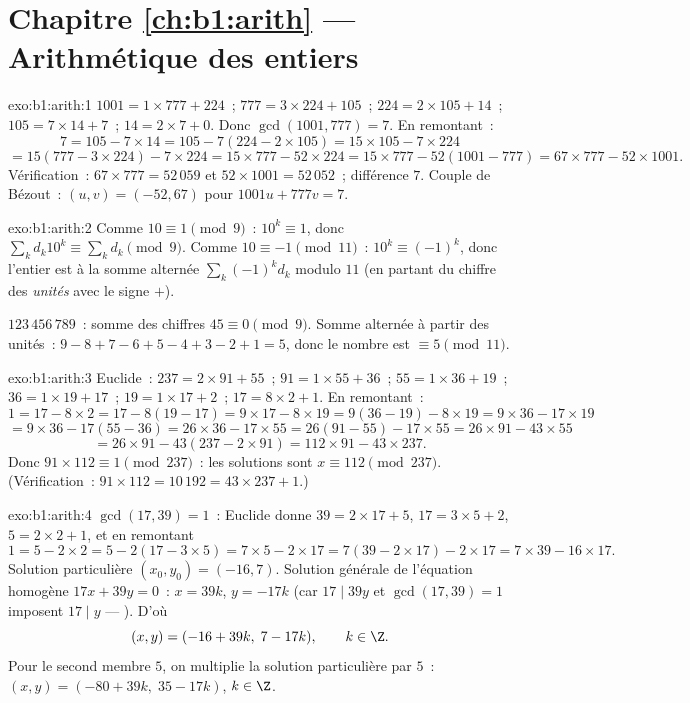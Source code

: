 \section*{Chapitre \ref{ch:b1:arith} --- Arithmétique des entiers}

\begin{solution}{exo:b1:arith:1}
$1001 = 1 \times 777 + 224$~; $777 = 3 \times 224 + 105$~; $224 = 2
\times 105 + 14$~; $105 = 7 \times 14 + 7$~; $14 = 2 \times 7 + 0$. Donc
$\gcd(1001, 777) = 7$. En remontant~:
\[
7 = 105 - 7 \times 14
= 105 - 7(224 - 2\times 105) = 15 \times 105 - 7 \times 224
\]
\[
= 15(777 - 3\times 224) - 7\times 224 = 15 \times 777 - 52 \times 224
= 15 \times 777 - 52(1001 - 777) = 67 \times 777 - 52 \times 1001 .
\]
Vérification~: $67 \times 777 = 52\,059$ et $52 \times 1001 = 52\,052$~;
différence $7$. Couple de Bézout~: $(u, v) = (-52, 67)$ pour $1001u + 777v =
7$.
\end{solution}

\begin{solution}{exo:b1:arith:2}
Comme $10 \equiv 1 \pmod 9$~: $10^k \equiv 1$, donc $\sum_k d_k 10^k
\equiv \sum_k d_k \pmod 9$. Comme $10 \equiv -1 \pmod{11}$~: $10^k
\equiv (-1)^k$, donc l'entier est  à la somme alternée
$\sum_k (-1)^k d_k$ modulo $11$ (en partant du chiffre des \emph{unités}
avec le signe $+$).

$123\,456\,789$~: somme des chiffres $45 \equiv 0 \pmod 9$. Somme alternée à partir
des unités~: $9 - 8 + 7 - 6 + 5 - 4 + 3 - 2 + 1 = 5$, donc le nombre est
$\equiv 5 \pmod{11}$.
\end{solution}

\begin{solution}{exo:b1:arith:3}
Euclide~: $237 = 2 \times 91 + 55$~; $91 = 1 \times 55 + 36$~; $55 = 1
\times 36 + 19$~; $36 = 1 \times 19 + 17$~; $19 = 1 \times 17 + 2$~; $17
= 8 \times 2 + 1$. En remontant~:
\[
1 = 17 - 8\times 2 = 17 - 8(19 - 17) = 9\times 17 - 8\times 19
= 9(36 - 19) - 8\times 19 = 9\times 36 - 17\times 19
\]
\[
= 9\times 36 - 17(55 - 36) = 26\times 36 - 17\times 55
= 26(91 - 55) - 17\times 55 = 26\times 91 - 43\times 55
\]
\[
= 26\times 91 - 43(237 - 2\times 91) = 112 \times 91 - 43 \times 237.
\]
Donc $91 \times 112 \equiv 1 \pmod{237}$~: les solutions sont $x \equiv
112 \pmod{237}$. (Vérification~: $91 \times 112 = 10\,192 = 43 \times 237 +
1$.)
\end{solution}

\begin{solution}{exo:b1:arith:4}
$\gcd(17, 39) = 1$~: Euclide donne $39 = 2\times 17 + 5$, $17 = 3\times
5 + 2$, $5 = 2\times 2 + 1$, et en remontant
\[
1 = 5 - 2\times 2 = 5 - 2(17 - 3\times 5) = 7\times 5 - 2\times 17
= 7(39 - 2\times 17) - 2\times 17 = 7\times 39 - 16\times 17 .
\]
Solution particulière $(x_0, y_0) = (-16, 7)$. Solution générale de
l'équation homogène $17x + 39y = 0$~: $x = 39k$, $y = -17k$ (car
$17 \mid 39y$ et $\gcd(17,39) = 1$ imposent $17 \mid y$ ---
). D'où
\[
(x, y) = (-16 + 39k,\; 7 - 17k), \qquad k \in \Z .
\]
Pour le second membre $5$, on multiplie la solution particulière par $5$~:
$(x, y) = (-80 + 39k,\; 35 - 17k)$, $k \in \Z$.
\end{solution}

